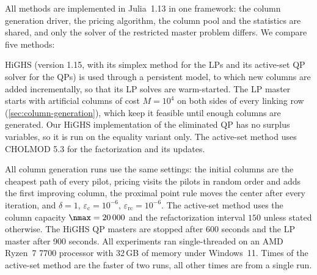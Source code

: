 All methods are implemented in Julia~1.13 \cite{bezanson2017julia} in one framework: the
column generation driver, the pricing algorithm, the column pool and the statistics are
shared, and only the solver of the restricted master problem differs. We compare five
methods:

\begin{center}
\renewcommand{\arraystretch}{1.2}
\end{center}

HiGHS \cite{huangfu2018parallelizing} (version 1.15, with its simplex method for the LPs and
its active-set QP solver for the QPs) is used through a persistent model, to which new columns
are added incrementally, so that its LP solves are warm-started. The LP master starts with
artificial columns of cost $M = 10^4$ on both sides of every linking row (\cref{sec:column-generation}),
which keep it feasible until enough columns are generated. Our HiGHS implementation of the
eliminated QP has no surplus variables, so it is run on the equality variant only. The active-set method uses CHOLMOD 5.3 \cite{chen2008cholmod} for the factorization and
its updates.

\medskip

All column generation runs use the same settings: the initial columns are the cheapest path
of every pilot, pricing visits the pilots in random order and adds the first improving
column, the proximal point rule moves the center after every iteration, and $\delta = 1$,
$\varepsilon_{\mathrm{c}} = 10^{-6}$, $\varepsilon_{\mathrm{rc}} = 10^{-6}$. The active-set method uses the
column capacity $\nmax = 20\,000$ and the refactorization interval $150$ unless stated
otherwise. The HiGHS QP masters are stopped after 600 seconds and the LP master after 900
seconds. All experiments ran single-threaded on an AMD Ryzen~7 7700 processor with 32\,GB of
memory under Windows~11. Times of the active-set method are the faster of two runs, all other
times are from a single run.


